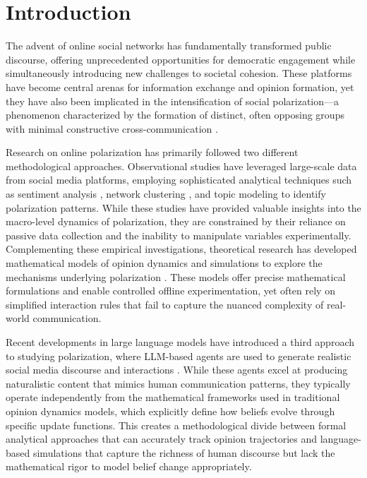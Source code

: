 \section{Introduction}

The advent of online social networks has fundamentally transformed public discourse, offering unprecedented opportunities for democratic engagement while simultaneously introducing new challenges to societal cohesion. These platforms have become central arenas for information exchange and opinion formation, yet they have also been implicated in the intensification of social polarization—a phenomenon characterized by the formation of distinct, often opposing groups with minimal constructive cross-communication \citep{grover_dilemma_2022, kubin_role_2021, bail_exposure_2018}.

Research on online polarization has primarily followed two different methodological approaches. Observational studies have leveraged large-scale data from social media platforms, employing sophisticated analytical techniques such as sentiment analysis \citep{karjus_evolving_2024, alsinet_measuring_2021, buder_does_2021}, network clustering \citep{treuillier_gaining_2024, bond_political_2022, al_amin_unveiling_2017}, and topic modeling \citep{kim_polarized_2019, chen_modeling_2021} to identify polarization patterns. While these studies have provided valuable insights into the macro-level dynamics of polarization, they are constrained by their reliance on passive data collection and the inability to manipulate variables experimentally. Complementing these empirical investigations, theoretical research has developed mathematical models of opinion dynamics and simulations to explore the mechanisms underlying polarization \citep{hegselmann_opinion_2002,degroot_reaching_1974,sasahara_social_2021,del_vicario_modeling_2017}. These models offer precise mathematical formulations and enable controlled offline experimentation, yet often rely on simplified interaction rules that fail to capture the nuanced complexity of real-world communication.

Recent developments in large language models have introduced a third approach to studying polarization, where LLM-based agents are used to generate realistic social media discourse and interactions \citep{chuang_simulating_2024,breum_persuasive_2024,ohagi_polarization_2024}. While these agents excel at producing naturalistic content that mimics human communication patterns, they typically operate independently from the mathematical frameworks used in traditional opinion dynamics models, which explicitly define how beliefs evolve through specific update functions. This creates a methodological divide between formal analytical approaches that can accurately track opinion trajectories and language-based simulations that capture the richness of human discourse but lack the mathematical rigor to model belief change appropriately. 

